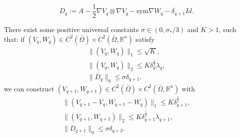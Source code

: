 \documentclass[10pt,a4paper]{amsart}
\newcommand{\R}{\mathbb{R}}
\newcommand{\sym}{\text{sym}}
\begin{document}
\begin{equation}\label{881}
   D_q:= A-\frac{1}{2}\nabla V_q\otimes\nabla V_q-\sym\nabla W_q-\delta_{q+1}Id.
\end{equation}

\begin{prop}\label{prop1}
    There exist some positive universal constants $\sigma\in(0,\sigma_*/3)$ and $K>1$, such that: if $(V_q,W_q)\in C^2(\bar\Omega)\times C^2(\bar\Omega,\R^n)$ satisfy
    \begin{gather}
         \|(V_q,W_q)\|_1\le \sqrt{K}, \label{prop1.a1}\\
         \|(V_q,W_q)\|_2\le K\delta_q^\frac{1}{2}\lambda_q, \label{prop1.a2}\\
         \|D_q\|_0\le{\sigma}\delta_{q+1}. \label{prop1.a3}
    \end{gather}
    we can construct $(V_{q+1},W_{q+1})\in C^2(\bar\Omega)\times C^2(\bar\Omega,\R^n)$ with
    \begin{gather}
        \|(V_{q+1}-V_q, W_{q+1}-W_q)\|_1\le K\delta_{q+1}^\frac{1}{2}, \label{prop1.0}\\
        \|(V_{q+1},W_{q+1})\|_2\le K\delta_{q+1}^\frac{1}{2}\lambda_{q+1},\label{prop1.1}\\
         \|D_{q+1}\|_0\le{\sigma}\delta_{q+2}.\label{prop1.2}
    \end{gather}
\end{prop} 
\end{document}
